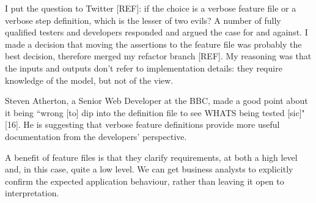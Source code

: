 I put the question to Twitter [REF]: if the choice is a verbose feature file or a verbose step definition, which is the lesser of two evils? A number of fully qualified testers and developers responded and argued the case for and against. I made a decision that moving the assertions to the feature file was probably the best decision, therefore merged my refactor branch [REF]. My reasoning was that the inputs and outputs don’t refer to implementation details: they require knowledge of the model, but not of the view. %

Steven Atherton, a Senior Web Developer at the BBC, made a good point about it being ``wrong [to] dip into the definition file to see WHATS being tested [sic]" [16]. He is suggesting that verbose feature definitions provide more useful documentation from the developers' perspective.

A benefit of feature files is that they clarify requirements, at both a high level and, in this case, quite a low level. We can get business analysts to explicitly confirm the expected application behaviour, rather than leaving it open to interpretation.